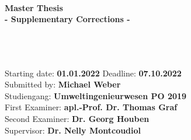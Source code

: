 \begin{titlepage}
    \enlargethispage{2.0cm}
    
    
    
    \par
    \href{https://www.hydromech.uni-hannover.de/en/}{}
    \hfill
    \href{https://www.uni-hannover.de/en/}{}\\%
    \par
    
    
    \begin{center}
    \vspace{2.0cm}
    
    {\Large \textbf{Master Thesis}}\\[0.25cm]
    {\Large \textbf{- Supplementary Corrections -} }\\[0.5cm]
    {\large {}} \\[0.2cm]
    {\large {}}\\[0.5cm]
    {\large {}}\\[3.2cm]
       
    
            
    \end{center}
    
    {\large Starting date: \textbf{01.01.2022} \hfill \large Deadline: \textbf{07.10.2022}} \\[0.5cm]
    {\large Submitted by: \hfill \textbf{Michael Weber}\\ Studiengang: \hfill \textbf{Umweltingenieurwesen PO 2019}}\\[0.5cm]
    {\large First Examiner: \hfill \large \textbf{apl.-Prof. Dr. Thomas Graf}}\\[0.5cm]
    {\large Second Examiner: \hfill \large \textbf{Dr. Georg Houben}}\\[0.5cm]
    {\large Supervisor: \hfill \large \textbf{Dr. Nelly Montcoudiol}\\}
    
\end{titlepage}